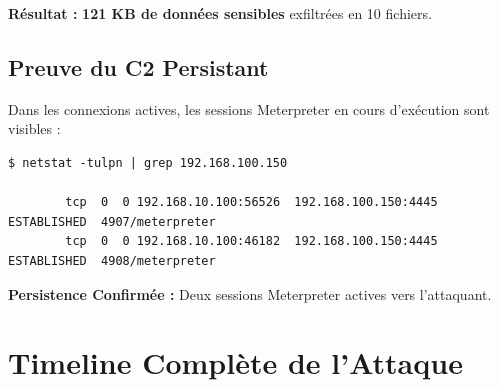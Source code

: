 \documentclass[12pt,a4paper,openany]{report}
\begin{document}
\textbf{Résultat :} \textbf{121 KB de données sensibles} exfiltrées en 10 fichiers.

\subsection{Preuve du C2 Persistant}

Dans les connexions actives, les sessions Meterpreter en cours d'exécution sont visibles :

\begin{lstlisting}[style=logstyle,caption=Connexions reseau actives revelant le C2 Meterpreter]
		$ netstat -tulpn | grep 192.168.100.150
		
		tcp  0  0 192.168.10.100:56526  192.168.100.150:4445  ESTABLISHED  4907/meterpreter
		tcp  0  0 192.168.10.100:46182  192.168.100.150:4445  ESTABLISHED  4908/meterpreter
	\end{lstlisting}

\textcolor{success}{\checkmark} \textbf{Persistence Confirmée :} Deux sessions Meterpreter actives vers l'attaquant.

\section{Timeline Complète de l'Attaque}
\end{document}
